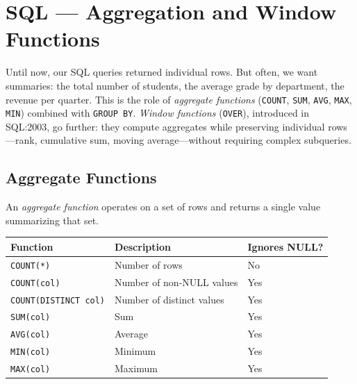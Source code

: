 \chapter{SQL --- Aggregation and Window Functions}
\label{ch:aggregation}

Until now, our SQL queries returned individual rows. But often, we want summaries: the total number of students, the average grade by department, the revenue per quarter. This is the role of \emph{aggregate functions} (\texttt{COUNT}, \texttt{SUM}, \texttt{AVG}, \texttt{MAX}, \texttt{MIN}) combined with \texttt{GROUP BY}. \emph{Window functions} (\texttt{OVER}), introduced in SQL:2003, go further: they compute aggregates while preserving individual rows---rank, cumulative sum, moving average---without requiring complex subqueries.

\section{Aggregate Functions}

\begin{definition}
An \emph{aggregate function} operates on a set of rows and returns a single
value summarizing that set.
\end{definition}

\begin{keyformulas}[title=\textbf{Standard Aggregate Functions}]
\begin{center}
\begin{tabular}{lll}
\toprule
\textbf{Function} & \textbf{Description} & \textbf{Ignores NULL?} \\
\midrule
\texttt{COUNT(*)} & Number of rows & No \\
\texttt{COUNT(col)} & Number of non-NULL values & Yes \\
\texttt{COUNT(DISTINCT col)} & Number of distinct values & Yes \\
\texttt{SUM(col)} & Sum & Yes \\
\texttt{AVG(col)} & Average & Yes \\
\texttt{MIN(col)} & Minimum & Yes \\
\texttt{MAX(col)} & Maximum & Yes \\
\bottomrule
\end{tabular}
\end{center}
\end{keyformulas}

